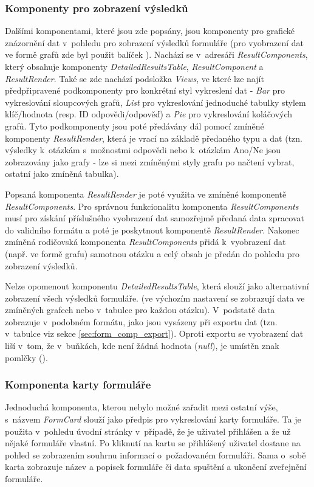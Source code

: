 		\subsubsection{Komponenty pro zobrazení výsledků} \label{sec:komp_vysledky} %
		Dalšími komponentami, které jsou zde popsány, jsou komponenty pro grafické znázornění dat v~pohledu pro zobrazení výsledků formuláře (pro vyobrazení dat ve formě grafů zde byl použit balíček ). Nachází se v~adresáři \textit{ResultComponents}, který obsahuje komponenty \textit{DetailedResultsTable}, \textit{ResultComponent} a \textit{ResultRender}. Také se zde nachází podsložka \textit{Views}, ve které lze najít předpřipravené podkomponenty pro konkrétní styl vykreslení dat - \textit{Bar} pro vykreslování sloupcových grafů, \textit{List} pro vykreslování jednoduché tabulky stylem klíč/hodnota (resp. ID odpovědi/odpověď) a \textit{Pie} pro vykreslování koláčových grafů. Tyto podkomponenty jsou poté předávány dál pomocí zmíněné komponenty \textit{ResultRender}, která je vrací na základě předaného typu a dat (tzn. výsledky k~otázkám s~možnostmi odpovědi nebo k~otázkám Ano/Ne jsou zobrazovány jako grafy - lze si mezi zmíněnými styly grafu po načtení vybrat, ostatní jako zmíněná tabulka).
		
		Popsaná komponenta \textit{ResultRender} je poté využita ve zmíněné komponentě \textit{ResultComponents}. Pro správnou funkcionalitu komponenta \textit{ResultComponents} musí pro získání příslušného vyobrazení dat samozřejmě předaná data zpracovat do validního formátu a poté je poskytnout komponentě \textit{ResultRender}. Nakonec zmíněná rodičovská komponenta \textit{ResultComponents} přidá k~vyobrazení dat (např. ve formě grafu) samotnou otázku a celý obsah je předán do pohledu pro zobrazení výsledků.
		
		Nelze opomenout komponentu \textit{DetailedResultsTable}, která slouží jako alternativní zobrazení všech výsledků formuláře. (ve výchozím nastavení se zobrazují data ve zmíněných grafech nebo v~tabulce pro každou otázku). V~podstatě data zobrazuje v~podobném formátu, jako jsou vysázeny při exportu dat (tzn. v~tabulce viz sekce \ref{sec:form_comp_export}). Oproti exportu se vyobrazení dat liší v~tom, že v~buňkách, kde není žádná hodnota (\textit{null}), je umístěn znak pomlčky (\uv{-}).
		
		\subsubsection{Komponenta karty formuláře}\label{sec:fe_komp_karta_form}
		Jednoduchá komponenta, kterou nebylo možné zařadit mezi ostatní výše, s~názvem \textit{FormCard} slouží jako předpis pro vykreslování karty formuláře. Ta je použita v~pohledu úvodní stránky v~případě, že je uživatel přihlášen a že už nějaké formuláře vlastní. Po kliknutí na kartu se přihlášený uživatel dostane na pohled se zobrazením souhrnu informací o~požadovaném formuláři. Sama o~sobě karta zobrazuje název a popisek formuláře či data spuštění a ukončení zveřejnění formuláře.
	
